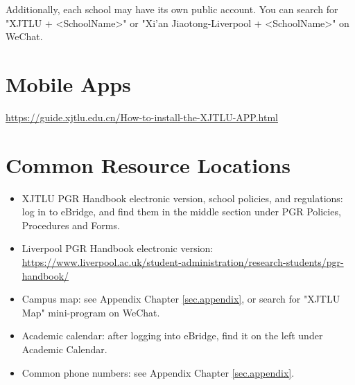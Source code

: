 Additionally, each school may have its own public account. You can search for "XJTLU + <SchoolName>" or "Xi'an Jiaotong-Liverpool + <SchoolName>" on WeChat.

\section{Mobile Apps}
\url{https://guide.xjtlu.edu.cn/How-to-install-the-XJTLU-APP.html}

\section{Common Resource Locations}
\begin{itemize}
    \item XJTLU PGR Handbook electronic version, school policies, and regulations: log in to eBridge, and find them in the middle section under PGR Policies, Procedures and Forms.
    \item Liverpool PGR Handbook electronic version: \url{https://www.liverpool.ac.uk/student-administration/research-students/pgr-handbook/}
    \item Campus map: see Appendix Chapter \ref{sec.appendix}, or search for "XJTLU Map" mini-program on WeChat.
    \item Academic calendar: after logging into eBridge, find it on the left under Academic Calendar.
    \item Common phone numbers: see Appendix Chapter \ref{sec.appendix}.
\end{itemize}

